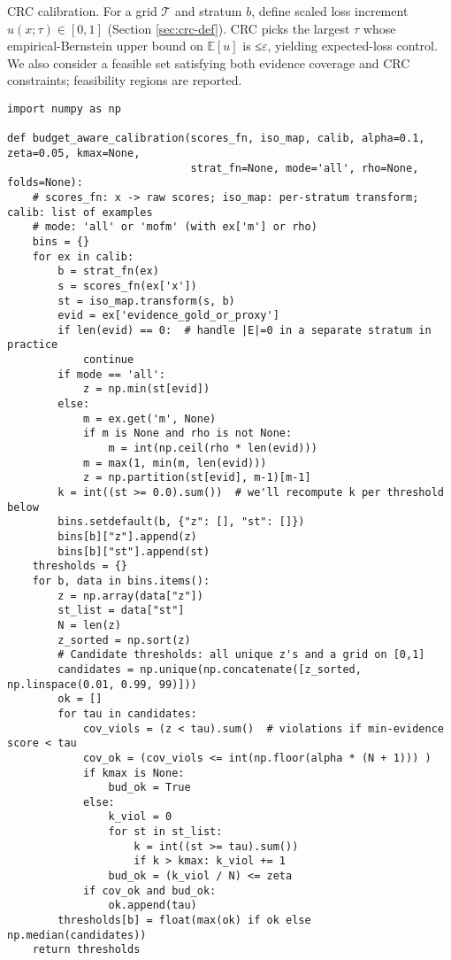 \documentclass[11pt]{article}
\begin{document}
CRC calibration. For a grid $\mathcal{T}$ and stratum $b$, define scaled loss increment $u(x;\tau)\in[0,1]$ (Section \ref{sec:crc-def}). CRC picks the largest $\tau$ whose empirical-Bernstein upper bound on $\mathbb{E}[u]$ is ≤$\varepsilon$, yielding expected-loss control. We also consider a feasible set satisfying both evidence coverage and CRC constraints; feasibility regions are reported.

\begin{lstlisting}[style=py, caption={Budget-aware conditional/Mondrian conformal calibration (split or CV+).}]
import numpy as np

def budget_aware_calibration(scores_fn, iso_map, calib, alpha=0.1, zeta=0.05, kmax=None,
                             strat_fn=None, mode='all', rho=None, folds=None):
    # scores_fn: x -> raw scores; iso_map: per-stratum transform; calib: list of examples
    # mode: 'all' or 'mofm' (with ex['m'] or rho)
    bins = {}
    for ex in calib:
        b = strat_fn(ex)
        s = scores_fn(ex['x'])
        st = iso_map.transform(s, b)
        evid = ex['evidence_gold_or_proxy']
        if len(evid) == 0:  # handle |E|=0 in a separate stratum in practice
            continue
        if mode == 'all':
            z = np.min(st[evid])
        else:
            m = ex.get('m', None)
            if m is None and rho is not None:
                m = int(np.ceil(rho * len(evid)))
            m = max(1, min(m, len(evid)))
            z = np.partition(st[evid], m-1)[m-1]
        k = int((st >= 0.0).sum())  # we'll recompute k per threshold below
        bins.setdefault(b, {"z": [], "st": []})
        bins[b]["z"].append(z)
        bins[b]["st"].append(st)
    thresholds = {}
    for b, data in bins.items():
        z = np.array(data["z"])
        st_list = data["st"]
        N = len(z)
        z_sorted = np.sort(z)
        # Candidate thresholds: all unique z's and a grid on [0,1]
        candidates = np.unique(np.concatenate([z_sorted, np.linspace(0.01, 0.99, 99)]))
        ok = []
        for tau in candidates:
            cov_viols = (z < tau).sum()  # violations if min-evidence score < tau
            cov_ok = (cov_viols <= int(np.floor(alpha * (N + 1))) )
            if kmax is None:
                bud_ok = True
            else:
                k_viol = 0
                for st in st_list:
                    k = int((st >= tau).sum())
                    if k > kmax: k_viol += 1
                bud_ok = (k_viol / N) <= zeta
            if cov_ok and bud_ok:
                ok.append(tau)
        thresholds[b] = float(max(ok) if ok else np.median(candidates))
    return thresholds
\end{lstlisting}
\end{document}
